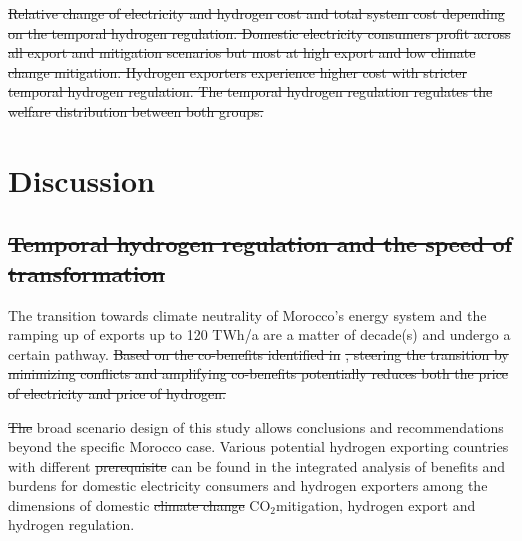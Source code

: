 \documentclass[5p,numafflabel]{elsarticle}
\newcommand{\co}{\ce{CO2}~}
\def\co{CO${}_2${\:}}
\providecommand{\DIFaddtex}[1]{{\protect\color{blue}\uwave{#1}}} %
\providecommand{\DIFdeltex}[1]{{\protect\color{red}\sout{#1}}}                      %
\providecommand{\DIFaddbegin}{} %
\providecommand{\DIFaddend}{} %
\providecommand{\DIFdelbegin}{} %
\providecommand{\DIFdelend}{} %
\providecommand{\DIFdelFL}[1]{\DIFdel{#1}} %
\providecommand{\DIFadd}[1]{\texorpdfstring{\DIFaddtex{#1}}{#1}} %
\providecommand{\DIFdel}[1]{\texorpdfstring{\DIFdeltex{#1}}{}} %
\newcommand{\DIFscaledelfig}{0.5}
\newlength{\DIFdelgraphicswidth} %
\newlength{\DIFdelgraphicsheight} %
\newcommand{\DIFaddincludegraphics}[2][]{{\color{blue}\fbox{\DIFOincludegraphics[#1]{#2}}}} %
\newcommand{\DIFdelincludegraphics}[2][]{%
\sbox{\DIFdelgraphicsbox}{\DIFOincludegraphics[#1]{#2}}%
\settoboxwidth{\DIFdelgraphicswidth}{\DIFdelgraphicsbox} %
\settoboxtotalheight{\DIFdelgraphicsheight}{\DIFdelgraphicsbox} %
\scalebox{\DIFscaledelfig}{%
\parbox[b]{\DIFdelgraphicswidth}{\usebox{\DIFdelgraphicsbox}\\[-\baselineskip] \rule{\DIFdelgraphicswidth}{0em}}\llap{\resizebox{\DIFdelgraphicswidth}{\DIFdelgraphicsheight}{%
\setlength{\unitlength}{\DIFdelgraphicswidth}%
\begin{picture}(1,1)%
\thicklines\linethickness{2pt} %
{\color[rgb]{1,0,0}\put(0,0){\framebox(1,1){}}}%
{\color[rgb]{1,0,0}\put(0,0){\line( 1,1){1}}}%
{\color[rgb]{1,0,0}\put(0,1){\line(1,-1){1}}}%
\end{picture}%
}\hspace*{3pt}}} %
} %
\DeclareRobustCommand{\DIFaddbegin}{\DIFOaddbegin \let\includegraphics\DIFaddincludegraphics} %
\DeclareRobustCommand{\DIFaddend}{\DIFOaddend \let\includegraphics\DIFOincludegraphics} %
\DeclareRobustCommand{\DIFdelbegin}{\DIFOdelbegin \let\includegraphics\DIFdelincludegraphics} %
\DeclareRobustCommand{\DIFdelend}{\DIFOaddend \let\includegraphics\DIFOincludegraphics} %
\begin{document}
\DIFdelbegin %
{%
\DIFdelFL{Relative change of electricity and hydrogen cost and total system cost depending on the temporal hydrogen regulation. Domestic electricity consumers profit across all export and mitigation scenarios but most at high export and low climate change mitigation. Hydrogen exporters experience higher cost with stricter temporal hydrogen regulation. The temporal hydrogen regulation regulates the welfare distribution between both groups.}}

\DIFdelend \section*{Discussion}
\label{sec:discussion}



\DIFdelbegin \subsection*{\DIFdel{Temporal hydrogen regulation and the speed of transformation}}
\DIFdelend %
The transition towards climate neutrality of Morocco's energy system and the ramping up of exports up to 120 TWh/a are a matter of decade(s) and undergo a certain pathway. 
\DIFdelbegin \DIFdel{Based on the co-benefits identified in }%
\DIFdel{, steering the transition by minimizing conflicts and amplifying co-benefits potentially reduces both the price of electricity and price of hydrogen. 
}%

\DIFdel{The }\DIFdelend %
\DIFaddbegin \DIFadd{However, the }\DIFaddend broad scenario design of this study allows conclusions and recommendations beyond the specific Morocco case.
Various potential hydrogen exporting countries with different \DIFdelbegin \DIFdel{prerequisite }\DIFdelend \DIFaddbegin \DIFadd{prerequisites }\DIFaddend can be found in the integrated analysis of benefits and burdens for domestic electricity consumers and hydrogen exporters among the dimensions of domestic \DIFdelbegin \DIFdel{climate change }\DIFdelend \DIFaddbegin \co \DIFaddend mitigation, hydrogen export and hydrogen regulation.
\end{document}
